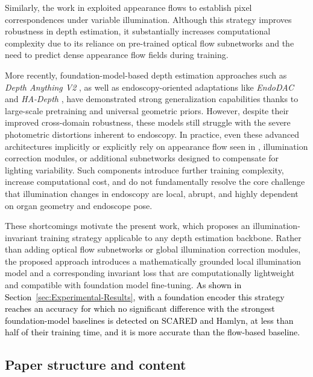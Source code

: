 \documentclass[a4paper,fleqn]{cas-dc}
\begin{document}
Similarly, the work in \citep{Shao_MIA_2022} exploited appearance flows to establish pixel correspondences under variable illumination. Although this strategy improves robustness in depth estimation, it substantially increases computational complexity due to its reliance on pre-trained optical flow subnetworks and the need to predict dense appearance flow fields during training.

More recently, foundation-model-based depth estimation approaches such as \emph{Depth Anything V2} \citep{DepthAnythingV2_2024}, as well as endoscopy-oriented adaptations like \emph{EndoDAC} \citep{EndoDAC_MICCAI_2024} and \emph{HA-Depth} \citep{HAdepth_2025}, have demonstrated strong generalization capabilities thanks to large-scale pretraining and universal geometric priors. However, despite their improved cross-domain robustness, these models still struggle with the severe photometric distortions inherent to endoscopy. In practice, even these advanced architectures implicitly or explicitly rely on appearance flow seen in \citep{Shao_MIA_2022} , illumination correction modules, or additional subnetworks designed to compensate for lighting variability. Such components introduce further training complexity, increase computational cost, and do not fundamentally resolve the core challenge that illumination changes in endoscopy are local, abrupt, and highly dependent on organ geometry and endoscope pose.

These shortcomings motivate the present work, which proposes an illumination-invariant training strategy applicable to any depth estimation backbone. Rather than adding optical flow subnetworks or global illumination correction modules, the proposed approach introduces a mathematically grounded local illumination model and a corresponding invariant loss that are computationally lightweight and compatible with 
foundation model fine-tuning. \textcolor{black}{As shown in Section~\ref{sec:Experimental-Results}, with a foundation encoder this strategy reaches an accuracy for which no significant difference with the strongest foundation-model baselines is detected on SCARED and Hamlyn, at less than half of their training time, and it is more accurate than the flow-based baseline.}
%
\subsection{Paper structure and content}
%
\end{document}
